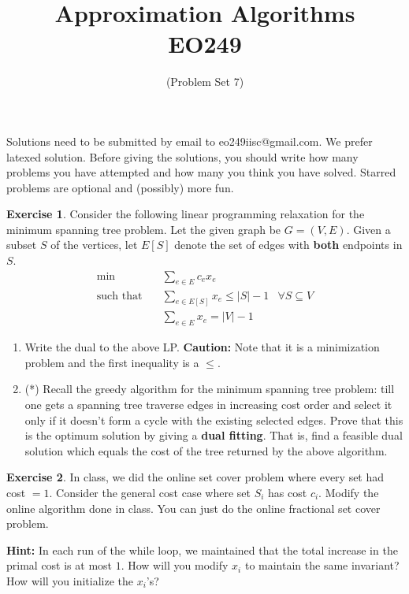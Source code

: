 \documentclass[11pt]{article}
\theoremstyle{definition}
\newtheorem{exercise}{Exercise}
\begin{document}
\title{{\bf Approximation Algorithms} \\ 
{\normalsize EO249}}
\date{(Problem Set 7)}
\maketitle
{\small 
Solutions need to be submitted by email to eo249iisc@gmail.com. We prefer latexed solution. 
Before giving the solutions, you should write how many problems you have attempted and how many you think you have solved.
Starred problems are optional and (possibly) more fun.
}
\vspace{1ex}
\def\poly{\mathrm{poly}}
\def\Exp{\mathbf{Exp}}
\def\Pr{\mathbf{Pr}}

\begin{exercise}
Consider the following linear programming relaxation for the minimum spanning tree problem.
Let the given graph be $G = (V,E)$. Given a subset $S$ of the vertices, let $E[S]$ denote the set of edges with {\bf both} endpoints in $S$.
\begin{align*}
\min & \quad \sum_{e\in E} c_ex_e & \\
\text{such that} & \quad \sum_{e\in E[S]} x_e \leq |S| - 1 & \forall S\subseteq V \\
& \quad \sum_{e\in E} x_e = |V| - 1
\end{align*}
\begin{enumerate}
\item Write the dual to the above LP. 
{\bf Caution:} Note that it is a minimization problem and the first inequality is a $\leq$.
\item (*) Recall the greedy algorithm for the minimum spanning tree problem: till one gets a spanning tree traverse edges in increasing cost order and select it only if it doesn't form a cycle with the existing selected edges. Prove that this is the optimum solution by giving a {\bf dual fitting}. That is, find a feasible dual solution which equals the cost of the tree returned by the above algorithm.
\end{enumerate}
\end{exercise}
\vspace{1ex}

\begin{exercise}
In class, we did the online set cover problem where every set had cost $= 1$. Consider the general cost case where set $S_i$ has cost $c_i$. Modify the online algorithm done in class. You can just do the online fractional set cover problem.

{\bf Hint:} In each run of the while loop, we maintained that the total increase in the primal cost is at most $1$. How will you modify $x_i$ to maintain the same invariant? How will you initialize the $x_i$'s?

\end{exercise}
\end{document}
